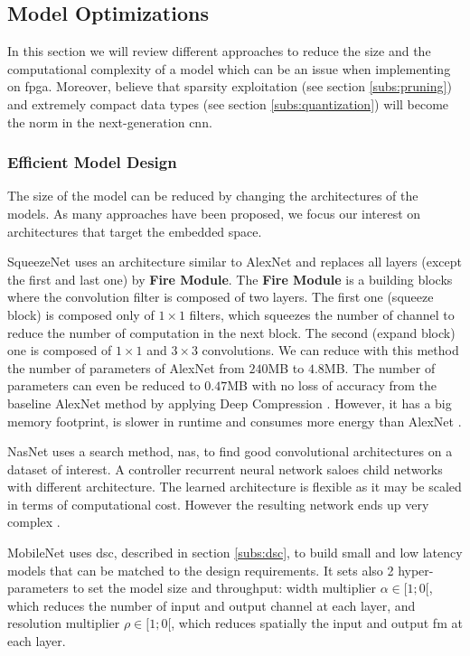 \subsection{Model Optimizations} \label{subsec:mdopti}
 In this section we will review different approaches to reduce the size and the computational complexity of a model which can be an issue when implementing on \acrshort{fpga}. Moreover, \textcite{nurvitadhi_can_2017} believe that sparsity exploitation (see section \ref{subs:pruning}) and extremely compact data types (see section \ref{subs:quantization}) will become the norm in the next-generation \acrshort{cnn}.
\subsubsection{Efficient Model Design}
The size of the model can be reduced by changing the architectures of the models. As many approaches have been proposed, we focus our interest on architectures that target the embedded space.

SqueezeNet \cite{iandola_squeezenet_2016} uses an architecture similar to AlexNet and replaces all layers (except the first and last one) by \textbf{Fire Module}. The \textbf{Fire Module} is a building blocks where the convolution filter is composed of two layers. The first one (squeeze block) is composed only of $1 \times 1$ filters, which squeezes the number of channel to reduce the number of computation in the next block. The second (expand block) one is composed of $1 \times 1$ and $3 \times 3$ convolutions. We can reduce with this method the number of parameters of AlexNet from $240$MB to $4.8$MB. The number of parameters can even be reduced to $0.47$MB with no loss of accuracy from the baseline AlexNet method by applying Deep Compression \cite{han_deep_2016}. However, it has a big memory footprint, is slower in runtime and consumes more energy than AlexNet \cite{sze_efficient_2017}.

NasNet \cite{zoph_learning_2018} uses a search method, \acrfull{nas}, to find good convolutional architectures on a dataset of interest. A controller recurrent neural network saloes child networks with different architecture. The learned architecture is flexible as it may be scaled in terms of computational cost. However the resulting network ends up very complex \cite{sandler_mobilenetv2_2019}.

MobileNet \cite{howard_mobilenets_2017} uses \acrshort{dsc}, described in section \ref{subs:dsc}, to build small and low latency models that can be matched to the design requirements. It sets also 2 hyper-parameters to set the model size and throughput: width multiplier $\alpha \in [1; 0[$, which reduces the number of input and output channel at each layer, and resolution multiplier $\rho \in [1; 0[$,  which reduces spatially the input and output \acrshort{fm} at each layer.

